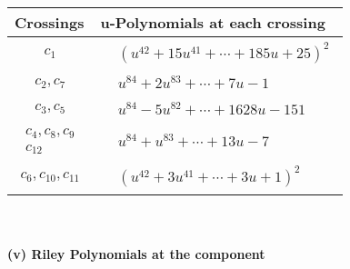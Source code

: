 \documentclass[1p]{elsarticle_modified}
\theoremstyle{definition}
\begin{document}
\begin{tabular}{m{50pt}|m{274pt}}
Crossings & \hspace{64pt}u-Polynomials at each crossing \\
\hline $$\begin{aligned}c_{1}\end{aligned}$$&$\begin{aligned}
&(u^{42}+15 u^{41}+\cdots+185 u+25)^{2}
\end{aligned}$\\
\hline $$\begin{aligned}c_{2},c_{7}\end{aligned}$$&$\begin{aligned}
&u^{84}+2 u^{83}+\cdots+7 u-1
\end{aligned}$\\
\hline $$\begin{aligned}c_{3},c_{5}\end{aligned}$$&$\begin{aligned}
&u^{84}-5 u^{82}+\cdots+1628 u-151
\end{aligned}$\\
\hline $$\begin{aligned}c_{4},c_{8},c_{9}\\c_{12}\end{aligned}$$&$\begin{aligned}
&u^{84}+u^{83}+\cdots+13 u-7
\end{aligned}$\\
\hline $$\begin{aligned}c_{6},c_{10},c_{11}\end{aligned}$$&$\begin{aligned}
&(u^{42}+3 u^{41}+\cdots+3 u+1)^{2}
\end{aligned}$\\
\hline
\end{tabular}\\~\\
\newpage\renewcommand{\arraystretch}{1}
\flushleft \textbf{(v) Riley Polynomials at the component}\newline \\
\end{document}

